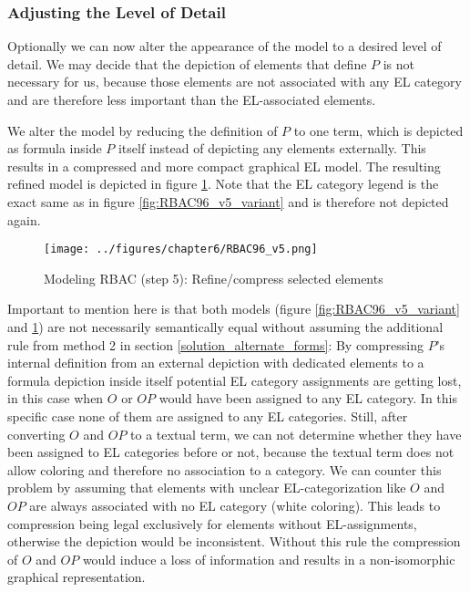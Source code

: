 \documentclass[twoside, openright, 12pt]{book}
\begin{document}
\subsubsection{Adjusting the Level of Detail}
\label{eval_lod}
Optionally we can now alter the appearance of the model to a desired level of detail.
We may decide that the depiction of elements that define $P$ is not necessary for us, because those elements are not associated with any EL category and are therefore less important than the EL-associated elements.

We alter the model by reducing the definition of $P$ to one term, which is depicted as formula inside $P$ itself instead of depicting any elements externally.
This results in a compressed and more compact graphical EL model.
The resulting refined model is depicted in figure \ref{fig:RBAC96_v5}.
Note that the EL category legend is the exact same as in figure \ref{fig:RBAC96_v5_variant} and is therefore not depicted again.

\begin{figure}[htb]
	\centering
	\texttt{[image: ../figures/chapter6/RBAC96\_v5.png]}
	\caption{Modeling RBAC (step 5): Refine/compress selected elements}
	\label{fig:RBAC96_v5}
\end{figure}

\noindent
Important to mention here is that both models (figure \ref{fig:RBAC96_v5_variant} and \ref{fig:RBAC96_v5}) are not necessarily semantically equal without assuming the additional rule from method 2 in section \ref{solution_alternate_forms}: 
By compressing $P$'s internal definition from an external depiction with dedicated elements to a formula depiction inside itself potential EL category assignments are getting lost, in this case when $O$ or $\mathit{OP}$ would have been assigned to any EL category.
In this specific case none of them are assigned to any EL categories.
Still, after converting $O$ and $\mathit{OP}$ to a textual term, we can not determine whether they have been assigned to EL categories before or not, because the textual term does not allow coloring and therefore no association to a category.
We can counter this problem by assuming that elements with unclear EL-categorization like $O$ and $\mathit{OP}$ are always associated with no EL category (white coloring).
This leads to compression being legal exclusively for elements without EL-assignments, otherwise the depiction would be inconsistent.
Without this rule the compression of $O$ and $\mathit{OP}$ would induce a loss of information and results in a non-isomorphic graphical representation.
\end{document}
